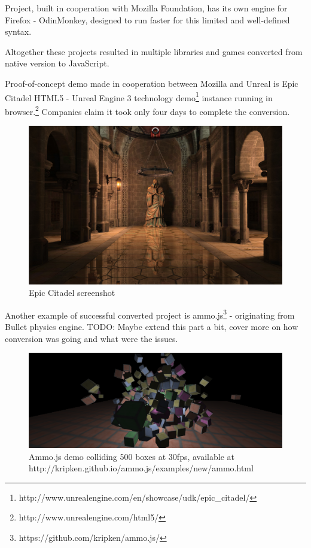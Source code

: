 

Project, built in cooperation with Mozilla Foundation, has its own engine for Firefox - OdinMonkey, designed to run faster for this limited and well-defined syntax.

Altogether these projects resulted in multiple libraries and games converted from native version to JavaScript.

Proof-of-concept demo made in cooperation between Mozilla and Unreal is Epic Citadel HTML5 - Unreal Engine 3 technology demo\footnote{http://www.unrealengine.com/en/showcase/udk/epic\_citadel/}  instance running in browser.\footnote{http://www.unrealengine.com/html5/} Companies claim it took only four days to complete the conversion.

\begin{figure}[h!]
  \caption{Epic Citadel screenshot}
  \label{img:epicitadel}
  \centering
	\includegraphics[width=16cm]{emscripten/epic-citadel.jpg}
\end{figure}

Another example of successful converted project is ammo.js\footnote{https://github.com/kripken/ammo.js/} - originating from Bullet physics engine.
TODO: Maybe extend this part a bit, cover more on how conversion was going and what were the issues.

\begin{figure}[h!]
  \caption{Ammo.js demo colliding 500 boxes at 30fps, available at http://kripken.github.io/ammo.js/examples/new/ammo.html}
  \label{img:epicitadel}
  \centering
	\includegraphics[width=16cm]{emscripten/ammojs.png}
\end{figure}


